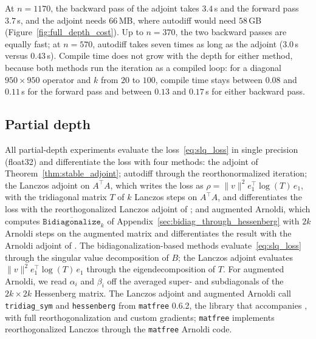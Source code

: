 \documentclass[a4paper,12pt]{article}
\theoremstyle{definition}
\begin{document}
At $n = 1170$, the backward pass of the adjoint takes $3.4$\,s and the forward pass $3.7$\,s, and the adjoint needs $66$\,MB, where autodiff would need $58$\,GB (Figure~\ref{fig:full_depth_cost}). Up to $n = 370$, the two backward passes are equally fast; at $n = 570$, autodiff takes seven times as long as the adjoint ($3.0$\,s versus $0.43$\,s). Compile time does not grow with the depth for either method, because both methods run the iteration as a compiled loop: for a diagonal $950 \times 950$ operator and $k$ from $20$ to $100$, compile time stays between $0.08$ and $0.11$\,s for the forward pass and between $0.13$ and $0.17$\,s for either backward pass.

\subsection{Partial depth}\label{app:partial_depth_setup}
All partial-depth experiments evaluate the loss~\eqref{eq:slq_loss} in single precision (float32) and differentiate the loss with four methods: the adjoint of Theorem~\ref{thm:stable_adjoint}; autodiff through the reorthonormalized iteration; the Lanczos adjoint on $A^\top A$, which writes the loss as $\rho = \|v\|^2 e_1^\top \log(T)\, e_1$, with the tridiagonal matrix $T$ of $k$ Lanczos steps on $A^\top A$, and differentiates the loss with the reorthogonalized Lanczos adjoint of \citet{kraemer2024gradients}; and augmented Arnoldi, which computes $\overline{\texttt{Bidiagonalize}}_k$ of Appendix~\ref{sec:bidiag_through_hessenberg} with $2k$ Arnoldi steps on the augmented matrix and differentiates the result with the Arnoldi adjoint of \citet{kraemer2024gradients}. The bidiagonalization-based methods evaluate~\eqref{eq:slq_loss} through the singular value decomposition of $B$; the Lanczos adjoint evaluates $\|v\|^2 e_1^\top \log(T)\, e_1$ through the eigendecomposition of $T$. For augmented Arnoldi, we read $\alpha_i$ and $\beta_i$ off the averaged super- and subdiagonals of the $2k \times 2k$ Hessenberg matrix. The Lanczos adjoint and augmented Arnoldi call \texttt{tridiag\_sym} and \texttt{hessenberg} from \texttt{matfree} 0.6.2, the library that accompanies \citet{kraemer2024gradients}, with full reorthogonalization and custom gradients; \texttt{matfree} implements reorthogonalized Lanczos through the \texttt{matfree} Arnoldi code.
\end{document}
